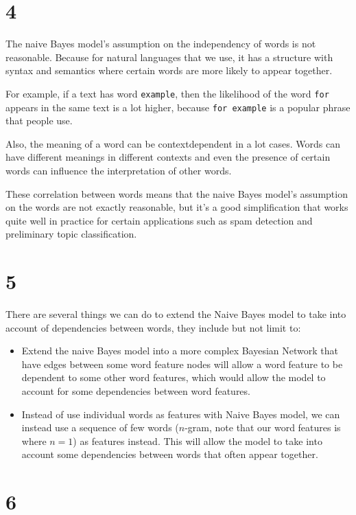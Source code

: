 \documentclass[12pt]{article}
\begin{document}
\begin{enumerate}
\part{4}
The naive Bayes model's assumption on the independency of words is not reasonable. Because for natural languages that we use, it has a structure with syntax and semantics where certain words are more likely to appear together.

For example, if a text has word \texttt{example}, then the likelihood of the word \texttt{for} appears in the same text is a lot higher, because \texttt{for example} is a popular phrase that people use.

Also, the meaning of a word can be context\-dependent in a lot cases. Words can have different meanings in different contexts and even the presence of certain words can influence the interpretation of other words.

These correlation between words means that the naive Bayes model's assumption on the words are not exactly reasonable, but it's a good simplification that works quite well in practice for certain applications such as spam detection and preliminary topic classification.

\part{5}
There are several things we can do to extend the Naive Bayes model to take into account of dependencies between words, they include but not limit to:

\begin{itemize}
	\item Extend the naive Bayes model into a more complex Bayesian Network that have edges between some word feature nodes will allow a word feature to be dependent to some other word features, which would allow the model to account for some dependencies between word features.
	
	\item Instead of use individual words as features with Naive Bayes model, we can instead use a sequence of few words ($n$-gram, note that our word features is where $n=1$) as features instead. This will allow the model to take into account some dependencies between words that often appear together.
	
\end{itemize}

\part{6}


\end{enumerate}
\end{document}
